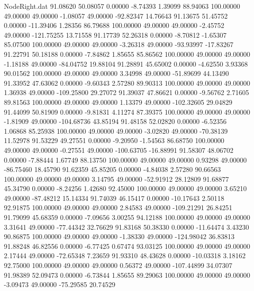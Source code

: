 \begin{filecontents}{NodeRight.dat}
  91.08620   50.08057    0.00000    -8.74393    1.39099   88.94063  100.00000   49.00000   49.00000   -1.08057   49.00000  -92.82347   14.76643
  91.13675   51.45752    0.00000   -11.39406    1.28356   86.79688  100.00000   49.00000   49.00000   -2.45752   49.00000 -121.75255   13.71558
  91.17739   52.26318    0.00000    -8.70812   -1.65307   85.07500  100.00000   49.00000   49.00000   -3.26318   49.00000  -93.93997  -17.83267
  91.22791   50.18188    0.00000    -7.84862    1.85655   85.86562  100.00000   49.00000   49.00000   -1.18188   49.00000  -84.04752   19.88104
  91.28891   45.65002    0.00000    -4.62550    3.93368   90.01562  100.00000   49.00000   49.00000    3.34998   49.00000  -51.89699   44.13490
  91.33952   47.63062    0.00000    -9.60343    2.57280   89.90313  100.00000   49.00000   49.00000    1.36938   49.00000 -109.25800   29.27072
  91.39037   47.86621    0.00000    -9.56762    2.71605   89.81563  100.00000   49.00000   49.00000    1.13379   49.00000 -102.32605   29.04829
  91.44099   50.81909    0.00000    -9.81831    4.11274   87.39375  100.00000   49.00000   49.00000   -1.81909   49.00000 -104.68736   43.85194
  91.48158   52.02820    0.00000    -6.52356    1.06868   85.25938  100.00000   49.00000   49.00000   -3.02820   49.00000  -70.38139   11.52978
  91.53229   49.27551    0.00000    -9.20950   -1.54563   86.68750  100.00000   49.00000   49.00000   -0.27551   49.00000 -100.63705  -16.88991
  91.58307   48.06702    0.00000    -7.88444    1.67749   88.13750  100.00000   49.00000   49.00000    0.93298   49.00000  -86.75460   18.45790
  91.62359   45.85205    0.00000    -4.84038    2.57280   90.66563  100.00000   49.00000   49.00000    3.14795   49.00000  -52.91912   28.12809
  91.68877   45.34790    0.00000    -8.24256    1.42680   92.45000  100.00000   49.00000   49.00000    3.65210   49.00000  -87.48212   15.14334
  91.74039   46.15417    0.00000   -10.17643    2.50118   92.91875  100.00000   49.00000   49.00000    2.84583   49.00000 -109.21291   26.84251
  91.79099   45.68359    0.00000    -7.09656    3.00255   94.12188  100.00000   49.00000   49.00000    3.31641   49.00000  -77.44342   32.76629
  91.83168   50.38330    0.00000   -11.64474    3.43230   90.86875  100.00000   49.00000   49.00000   -1.38330   49.00000 -124.98042   36.83813
  91.88248   46.82556    0.00000    -6.77425    0.67474   93.03125  100.00000   49.00000   49.00000    2.17444   49.00000  -72.65348    7.23659
  91.93310   48.43628    0.00000   -10.03318    3.18162   92.75000  100.00000   49.00000   49.00000    0.56372   49.00000 -107.44899   34.07307
  91.98389   52.09473    0.00000    -6.73844    1.85655   89.29063  100.00000   49.00000   49.00000   -3.09473   49.00000  -75.29585   20.74529

\end{filecontents}

